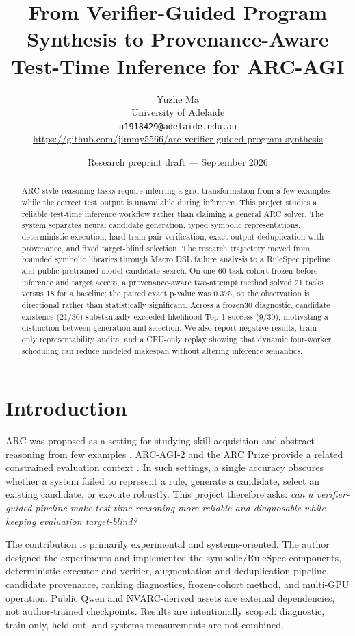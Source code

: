\documentclass[10pt]{article}
\title{From Verifier-Guided Program Synthesis to Provenance-Aware Test-Time Inference for ARC-AGI}
\author{Yuzhe Ma\\\small University of Adelaide\\\small \texttt{a1918429@adelaide.edu.au}\\\small \url{https://github.com/jimmy5566/arc-verifier-guided-program-synthesis}}
\date{Research preprint draft --- September 2026}
\begin{document}
\maketitle

\begin{abstract}
ARC-style reasoning tasks require inferring a grid transformation from a few examples while the correct test output is unavailable during inference. This project studies a reliable test-time inference workflow rather than claiming a general ARC solver. The system separates neural candidate generation, typed symbolic representations, deterministic execution, hard train-pair verification, exact-output deduplication with provenance, and fixed target-blind selection. The research trajectory moved from bounded symbolic libraries through Macro DSL failure analysis to a RuleSpec pipeline and public pretrained model candidate search. On one 60-task cohort frozen before inference and target access, a provenance-aware two-attempt method solved 21 tasks versus 18 for a baseline; the paired exact p-value was 0.375, so the observation is directional rather than statistically significant. Across a frozen30 diagnostic, candidate existence (21/30) substantially exceeded likelihood Top-1 success (9/30), motivating a distinction between generation and selection. We also report negative results, train-only representability audits, and a CPU-only replay showing that dynamic four-worker scheduling can reduce modeled makespan without altering inference semantics.
\end{abstract}

\section{Introduction}
ARC was proposed as a setting for studying skill acquisition and abstract reasoning from few examples \cite{chollet2019measure}. ARC-AGI-2 and the ARC Prize provide a related constrained evaluation context \cite{arcprize2026}. In such settings, a single accuracy obscures whether a system failed to represent a rule, generate a candidate, select an existing candidate, or execute robustly. This project therefore asks: \emph{can a verifier-guided pipeline make test-time reasoning more reliable and diagnosable while keeping evaluation target-blind?}

The contribution is primarily experimental and systems-oriented. The author designed the experiments and implemented the symbolic/RuleSpec components, deterministic executor and verifier, augmentation and deduplication pipeline, candidate provenance, ranking diagnostics, frozen-cohort method, and multi-GPU operation. Public Qwen and NVARC-derived assets are external dependencies, not author-trained checkpoints. Results are intentionally scoped: diagnostic, train-only, held-out, and systems measurements are not combined.
\end{document}
